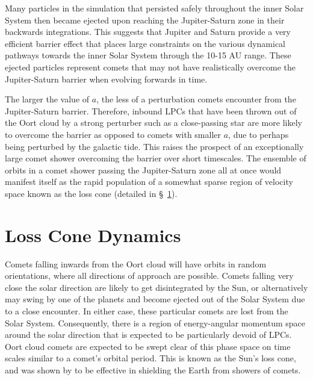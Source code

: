 Many particles in the simulation that persisted safely throughout the inner Solar System then became ejected upon reaching the Jupiter-Saturn zone in their backwards integrations. This suggests that Jupiter and Saturn provide a very efficient barrier effect that places large constraints on the various dynamical pathways towards the inner Solar System through the 10-15 AU range. These ejected particles represent comets that may not have realistically overcome the Jupiter-Saturn barrier when evolving forwards in time.

The larger the value of $a$, the less of a perturbation comets encounter from the Jupiter-Saturn barrier. Therefore, inbound LPCs that have been thrown out of the Oort cloud by a strong perturber such as a close-passing star are more likely to overcome the barrier as opposed to comets with smaller $a$, due to perhaps being perturbed by the galactic tide. This raises the prospect of an exceptionally large comet shower overcoming the barrier over short timescales. The ensemble of orbits in a comet shower passing the Jupiter-Saturn zone all at once would manifest itself as the rapid population of a somewhat sparse region of velocity space known as the loss cone (detailed in \S~\ref{sec:loss_cone}). %

\section{Loss Cone Dynamics}
\label{sec:loss_cone}

Comets falling inwards from the Oort cloud will have orbits in random orientations, where all directions of approach are possible. Comets falling very close the solar direction are likely to get disintegrated by the Sun, or alternatively may swing by one of the planets and become ejected out of the Solar System due to a close encounter. In either case, these particular comets are lost from the Solar System. Consequently, there is a region of energy-angular momentum space around the solar direction that is expected to be particularly devoid of LPCs. Oort cloud comets are expected to be swept clear of this phase space on time scales similar to a comet's orbital period. This is known as the Sun's loss cone, and was shown by \cite{1981AJ.....86.1730H} to be effective in shielding the Earth from showers of comets.

